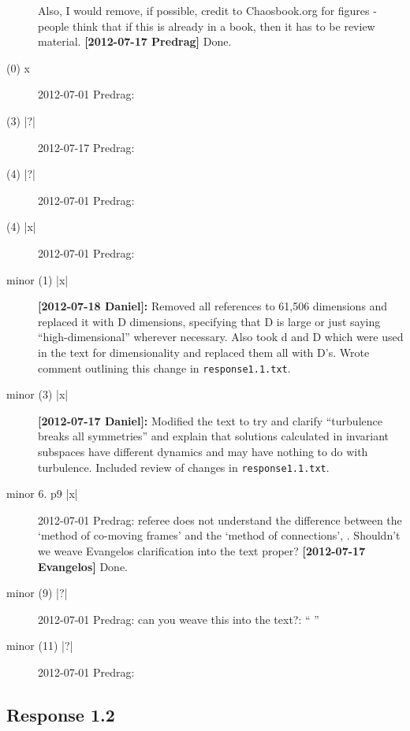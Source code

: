 \begin{description}
Also, I would remove, if possible, credit to Chaosbook.org for figures -
people think that if this is already in a book, then it has to be review
material.
 {\bf [2012-07-17 Predrag]} Done.


\item[(0)  x ] 2012-07-01 Predrag:

\item[(3) |?|] 2012-07-17 Predrag:

\item[(4) |?|] 2012-07-01 Predrag:

\item[(4) |x|] 2012-07-01 Predrag:

\item[minor (1) |x|] {\bf [2012-07-18 Daniel]:} Removed all references to
61,506 dimensions and replaced it with D dimensions, specifying that D is
large or just saying ``high-dimensional'' wherever necessary. Also took 
d and D which were used in the text for dimensionality and replaced them
all with D's. Wrote comment outlining this change in \texttt{response1.1.txt}.

\item[minor (3) |x|] {\bf [2012-07-17 Daniel]:} Modified the text to try
and clarify ``turbulence breaks all symmetries'' and explain that
solutions calculated in invariant subspaces have different dynamics and
may have nothing to do with turbulence. Included review of changes in
\texttt{response1.1.txt}.

\item[minor 6. p9 |x|] 2012-07-01 Predrag:
 referee does not understand the difference between the `method of
 co-moving frames' and the `method of connections',
 . Shouldn't we weave Evangelos clarification
 into the text proper? {\bf [2012-07-17 Evangelos]} Done.

\item[minor (9) |?|] 2012-07-01 Predrag: can you weave this into the text?: ``
''

\item[minor (11) |?|] 2012-07-01 Predrag:

\end{description}

\subsection{Response 1.2}
\label{sect:Response1.2}

